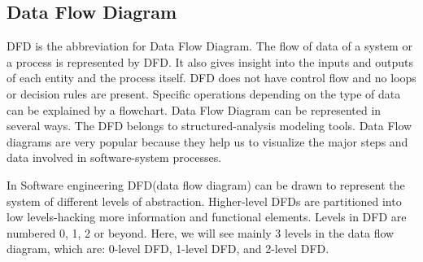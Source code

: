 \documentclass[12pt]{article}
\begin{document}
\subsection{Data Flow Diagram}

DFD is the abbreviation for Data Flow Diagram. The flow of data of a system or a process is represented by DFD. It also gives insight into the inputs and outputs of each entity and the process itself. DFD does not have control flow and no loops or decision rules are present. Specific operations depending on the type of data can be explained by a flowchart. Data Flow Diagram can be represented in several ways. The DFD belongs to structured-analysis modeling tools. Data Flow diagrams are very popular because they help us to visualize the major steps and data involved in software-system processes.

In Software engineering DFD(data flow diagram) can be drawn to represent the system of different levels of abstraction. Higher-level DFDs are partitioned into low levels-hacking more information and functional elements. Levels in DFD are numbered 0, 1, 2 or beyond. Here, we will see mainly 3 levels in the data flow diagram, which are: 0-level DFD, 1-level DFD, and 2-level DFD. 	
\end{document}
